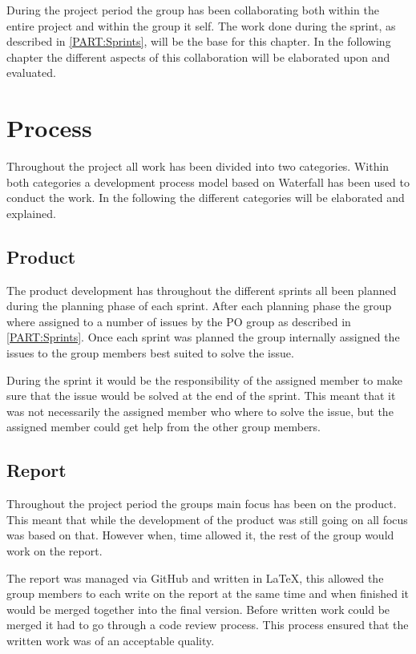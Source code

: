 During the project period the group has been collaborating both within the entire project and within the group it self. 
The work done during the sprint, as described in \autoref{PART:Sprints}, will be the base for this chapter.
In the following chapter the different aspects of this collaboration will be elaborated upon and evaluated. 

\section{Process}
Throughout the project all work has been divided into two categories. 
Within both categories a development process model based on Waterfall has been used to conduct the work. 
In the following the different categories will be elaborated and explained.

\subsection{Product}
The product development has throughout the different sprints all been planned during the planning phase of each sprint. 
After each planning phase the group where assigned to a number of issues by the PO group as described in \autoref{PART:Sprints}.
Once each sprint was planned the group internally assigned the issues to the group members best suited to solve the issue.

During the sprint it would be the responsibility of the assigned member to make sure that the issue would be solved at the end of the sprint. 
This meant that it was not necessarily the assigned member who where to solve the issue, but the assigned member could get help from the other group members.

\subsection{Report}
Throughout the project period the groups main focus has been on the product. 
This meant that while the development of the product was still going on all focus was based on that.
However when, time allowed it, the rest of the group would work on the report. 

The report was managed via GitHub and written in \LaTeX, this allowed the group members to each write on the report at the same time and when finished it would be merged together into the final version. 
Before written work could be merged it had to go through a code review process. 
This process ensured that the written work was of an acceptable quality. 

